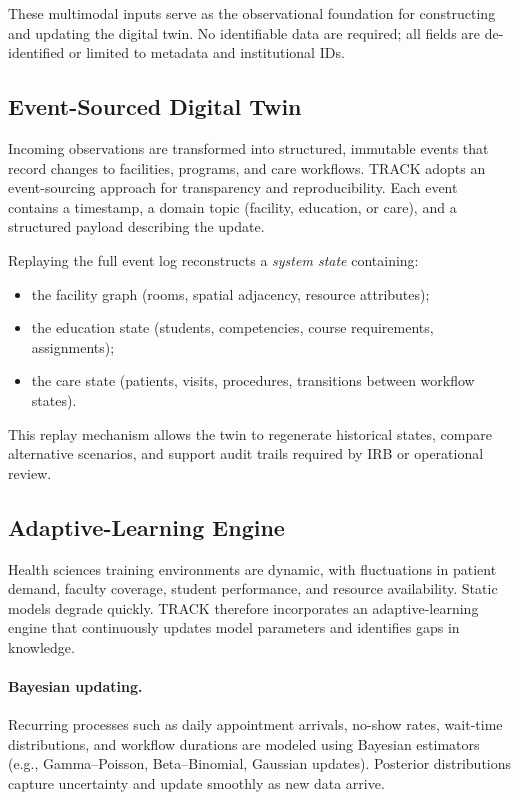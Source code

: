 \documentclass[Afour,sageh,times]{sagej}
\begin{document}
These multimodal inputs serve as the observational foundation for constructing and updating the digital twin. No identifiable data are required; all fields are de-identified or limited to metadata and institutional IDs.

\subsection{Event-Sourced Digital Twin}

Incoming observations are transformed into structured, immutable events that record changes to facilities, programs, and care workflows. TRACK adopts an event-sourcing approach for transparency and reproducibility. Each event contains a timestamp, a domain topic (facility, education, or care), and a structured payload describing the update.

Replaying the full event log reconstructs a \textit{system state} containing:
\begin{itemize}[leftmargin=*,itemsep=2pt]
    \item the facility graph (rooms, spatial adjacency, resource attributes);
    \item the education state (students, competencies, course requirements, assignments);
    \item the care state (patients, visits, procedures, transitions between workflow states).
\end{itemize}

This replay mechanism allows the twin to regenerate historical states, compare alternative scenarios, and support audit trails required by IRB or operational review.

\subsection{Adaptive-Learning Engine}

Health sciences training environments are dynamic, with fluctuations in patient demand, faculty coverage, student performance, and resource availability. Static models degrade quickly. TRACK therefore incorporates an adaptive-learning engine that continuously updates model parameters and identifies gaps in knowledge.

\paragraph{Bayesian updating.}
Recurring processes such as daily appointment arrivals, no-show rates, wait-time distributions, and workflow durations are modeled using Bayesian estimators (e.g., Gamma–Poisson, Beta–Binomial, Gaussian updates). Posterior distributions capture uncertainty and update smoothly as new data arrive.
\end{document}
